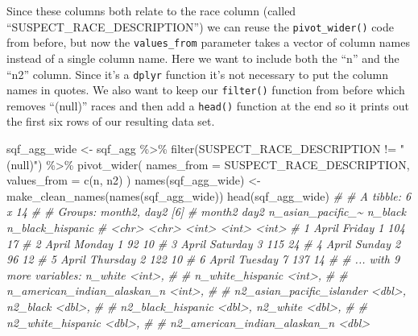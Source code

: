 \documentclass[
  a4paper,
]{krantz}
\makeatletter
\newenvironment{Shaded}{\begin{snugshade}}{\end{snugshade}}
\newcommand{\AttributeTok}[1]{\textcolor[rgb]{0.61,0.61,0.61}{#1}}
\newcommand{\CommentTok}[1]{\textcolor[rgb]{0.37,0.37,0.37}{\textit{#1}}}
\newcommand{\FunctionTok}[1]{\textcolor[rgb]{0,0,0}{#1}}
\newcommand{\NormalTok}[1]{#1}
\newcommand{\OtherTok}[1]{\textcolor[rgb]{0.37,0.37,0.37}{#1}}
\newcommand{\SpecialCharTok}[1]{\textcolor[rgb]{0,0,0}{#1}}
\newcommand{\StringTok}[1]{\textcolor[rgb]{0.5,0.5,0.5}{#1}}
\newenvironment{kframe}{%
\medskip{}
\setlength{\fboxsep}{.8em}
 \def\at@end@of@kframe{}%
 \ifinner\ifhmode%
  \def\at@end@of@kframe{\end{minipage}}%
  \begin{minipage}{\columnwidth}%
 \fi\fi%
 \def\FrameCommand##1{\hskip\@totalleftmargin \hskip-\fboxsep
 \colorbox{shadecolor}{##1}\hskip-\fboxsep
     \hskip-\linewidth \hskip-\@totalleftmargin \hskip\columnwidth}%
 \MakeFramed {\advance\hsize-\width
   \@totalleftmargin\z@ \linewidth\hsize
   \@setminipage}}%
 {\par\unskip\endMakeFramed%
 \at@end@of@kframe}
\renewenvironment{Shaded}{\begin{kframe}}{\end{kframe}}
\makeatother
\begin{document}
Since these columns both relate to the race column (called
``SUSPECT\_RACE\_DESCRIPTION'') we can reuse the
\texttt{pivot\_wider()} code from before, but now the
\texttt{values\_from} parameter takes a vector of column
names instead of a single column name. Here we want to
include both the ``n'' and the ``n2'' column. Since it's a
\texttt{dplyr} function it's not necessary to put the column
names in quotes. We also want to keep our \texttt{filter()}
function from before which removes ``(null)'' races and then
add a \texttt{head()} function at the end so it prints out
the first six rows of our resulting data set.

\begin{Shaded}
\begin{Highlighting}[]
\NormalTok{sqf\_agg\_wide }\OtherTok{\textless{}{-}}\NormalTok{ sqf\_agg }\SpecialCharTok{\%\textgreater{}\%}
  \FunctionTok{filter}\NormalTok{(SUSPECT\_RACE\_DESCRIPTION }\SpecialCharTok{!=} \StringTok{"(null)"}\NormalTok{) }\SpecialCharTok{\%\textgreater{}\%}
  \FunctionTok{pivot\_wider}\NormalTok{(}
    \AttributeTok{names\_from =}\NormalTok{ SUSPECT\_RACE\_DESCRIPTION,}
    \AttributeTok{values\_from =} \FunctionTok{c}\NormalTok{(n, n2)}
\NormalTok{  )}
\FunctionTok{names}\NormalTok{(sqf\_agg\_wide) }\OtherTok{\textless{}{-}} \FunctionTok{make\_clean\_names}\NormalTok{(}\FunctionTok{names}\NormalTok{(sqf\_agg\_wide))}
\FunctionTok{head}\NormalTok{(sqf\_agg\_wide)}
\CommentTok{\# \# A tibble: 6 x 14}
\CommentTok{\# \# Groups:   month2, day2 [6]}
\CommentTok{\#   month2 day2     n\_asian\_pacific\_\textasciitilde{} n\_black n\_black\_hispanic}
\CommentTok{\#   \textless{}chr\textgreater{}  \textless{}chr\textgreater{}                \textless{}int\textgreater{}   \textless{}int\textgreater{}            \textless{}int\textgreater{}}
\CommentTok{\# 1 April  Friday                   1     104               17}
\CommentTok{\# 2 April  Monday                   1      92               10}
\CommentTok{\# 3 April  Saturday                 3     115               24}
\CommentTok{\# 4 April  Sunday                   2      96               12}
\CommentTok{\# 5 April  Thursday                 2     122               10}
\CommentTok{\# 6 April  Tuesday                  7     137               14}
\CommentTok{\# \# ... with 9 more variables: n\_white \textless{}int\textgreater{},}
\CommentTok{\# \#   n\_white\_hispanic \textless{}int\textgreater{},}
\CommentTok{\# \#   n\_american\_indian\_alaskan\_n \textless{}int\textgreater{},}
\CommentTok{\# \#   n2\_asian\_pacific\_islander \textless{}dbl\textgreater{}, n2\_black \textless{}dbl\textgreater{},}
\CommentTok{\# \#   n2\_black\_hispanic \textless{}dbl\textgreater{}, n2\_white \textless{}dbl\textgreater{},}
\CommentTok{\# \#   n2\_white\_hispanic \textless{}dbl\textgreater{},}
\CommentTok{\# \#   n2\_american\_indian\_alaskan\_n \textless{}dbl\textgreater{}}
\end{Highlighting}
\end{Shaded}
\end{document}

